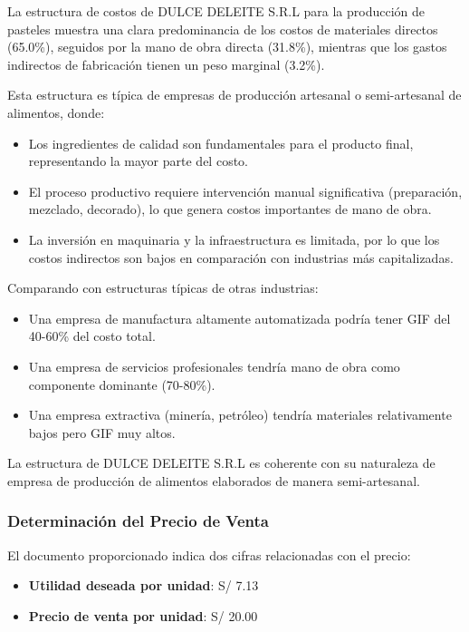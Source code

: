 \documentclass[
  stu,
  floatsintext,
  longtable,
  a4paper,
  nolmodern,
  notxfonts,
  notimes,
  12pt,
  colorlinks=true,linkcolor=blue,citecolor=blue,urlcolor=blue]{apa7}
\providecommand{\tightlist}{%
  \setlength{\itemsep}{0pt}\setlength{\parskip}{0pt}}
\begin{document}
La estructura de costos de DULCE DELEITE S.R.L para la producción de
pasteles muestra una clara predominancia de los costos de materiales
directos (65.0\%), seguidos por la mano de obra directa (31.8\%),
mientras que los gastos indirectos de fabricación tienen un peso
marginal (3.2\%).

Esta estructura es típica de empresas de producción artesanal o
semi-artesanal de alimentos, donde:

\begin{itemize}
\tightlist
\item
  Los ingredientes de calidad son fundamentales para el producto final,
  representando la mayor parte del costo.
\item
  El proceso productivo requiere intervención manual significativa
  (preparación, mezclado, decorado), lo que genera costos importantes de
  mano de obra.
\item
  La inversión en maquinaria y la infraestructura es limitada, por lo
  que los costos indirectos son bajos en comparación con industrias más
  capitalizadas.
\end{itemize}

Comparando con estructuras típicas de otras industrias:

\begin{itemize}
\tightlist
\item
  Una empresa de manufactura altamente automatizada podría tener GIF del
  40-60\% del costo total.
\item
  Una empresa de servicios profesionales tendría mano de obra como
  componente dominante (70-80\%).
\item
  Una empresa extractiva (minería, petróleo) tendría materiales
  relativamente bajos pero GIF muy altos.
\end{itemize}

La estructura de DULCE DELEITE S.R.L es coherente con su naturaleza de
empresa de producción de alimentos elaborados de manera semi-artesanal.

\subsubsection{Determinación del Precio de
Venta}\label{determinaciuxf3n-del-precio-de-venta}

El documento proporcionado indica dos cifras relacionadas con el precio:

\begin{itemize}
\tightlist
\item
  \textbf{Utilidad deseada por unidad}: S/ 7.13
\item
  \textbf{Precio de venta por unidad}: S/ 20.00
\end{itemize}
\end{document}
